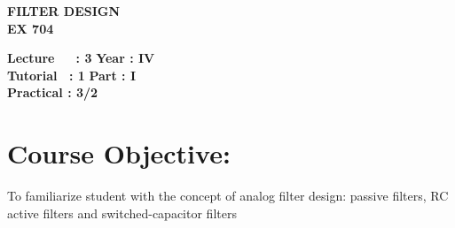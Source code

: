 \begin{center}
    \textbf{\huge{\uppercase{Filter Design}}}
    \\
    \vspace{.5cm}
    \textbf{\large{EX 704}}
\end{center}

\noindent\textbf{Lecture\ \ \ : 3} \hfill \textbf{Year : IV} \\
\textbf{Tutorial \ : 1} \hfill \textbf{Part : I } \\
\textbf{Practical : 3/2}  \\

\par
\noindent 
\section*{Course Objective:}
To familiarize student with the concept of analog filter design: passive filters, RC active filters and switched-capacitor filters

